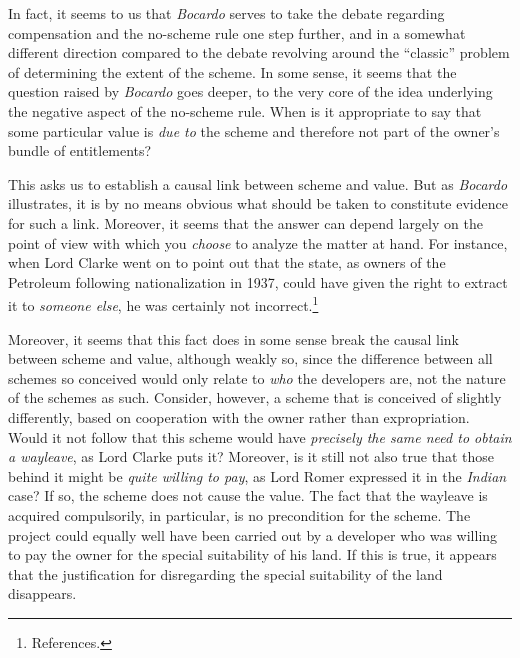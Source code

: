 In fact, it seems to us that \emph{Bocardo} serves to take the debate regarding compensation and the no-scheme rule one step further, and in a somewhat different direction compared to the debate revolving around the ``classic'' problem of determining the extent of the scheme. In some sense, it seems that the question raised by \emph{Bocardo} goes deeper, to the very core of the idea underlying the negative aspect of the no-scheme rule. When is it appropriate to say that some particular value is \emph{due to} the scheme and therefore not part of the owner's bundle of entitlements?

This asks us to establish a causal link between scheme and value. But as \emph{Bocardo} illustrates, it is by no means obvious what should be taken to constitute evidence for such a link. Moreover, it seems that the answer can depend largely on the point of view with which you \emph{choose} to analyze the matter at hand. For instance, when Lord Clarke went on to point out that the state, as owners of the Petroleum following nationalization in 1937, could have given the right to extract it to \emph{someone else}, he was certainly not incorrect.\footnote{References.} 

Moreover, it seems that this fact does in some sense break the causal link between scheme and value, although weakly so, since the difference between all schemes so conceived would only relate to \emph{who} the developers are, not the nature of the schemes as such. Consider, however, a scheme that is conceived of slightly differently, based on cooperation with the owner rather than expropriation. Would it not follow that this scheme would have \emph{precisely the same need to obtain a wayleave}, as Lord Clarke puts it? Moreover, is it still not also true that those behind it might be \emph{quite willing to pay}, as Lord Romer expressed it in the \emph{Indian} case? If so, the scheme does not cause the value. The fact that the wayleave is acquired compulsorily, in particular, is no precondition for the scheme. The project could equally well have been carried out by a developer who was willing to pay the owner for the special suitability of his land. If this is true, it appears that the justification for disregarding the special suitability of the land disappears.

